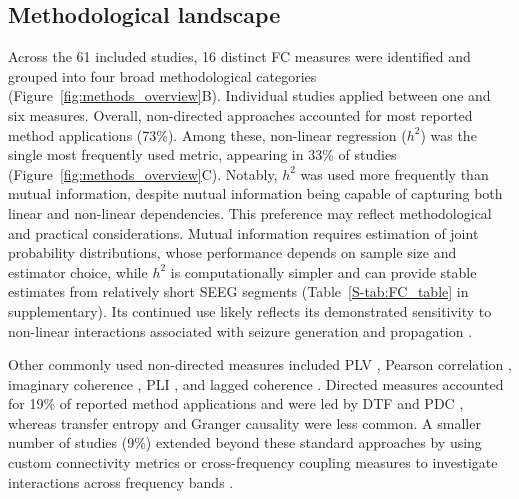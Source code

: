 \documentclass[12pt]{article}
\begin{document}
\subsection{Methodological landscape}
Across the 61 included studies, 16 distinct FC measures were identified and grouped into four broad methodological categories (Figure~\ref{fig:methods_overview}B). Individual studies applied between one and six measures. Overall, non-directed approaches accounted for most reported method applications (73\%). Among these, non-linear regression ($h^2$) was the single most frequently used metric, appearing in 33\% of studies \cite{Bettus2011-jh, Evangelista2015-dz, Courtens2016-zs, Hagiwara2017-sz, lagarde2018interictal, Aupy2019-je, Wang2019-jl, Balatskaya2020-vi, Fonti2021-dz, Wang2021-iw, Hu2023-kr, Li2023-vy, Simula2023-lj, Soulier2023-rr, Yang2023-xe, Ye2023-jm, Soncin2024-iz, Zanello2024-ap, Chibany2025-ob, He2025-tw} (Figure~\ref{fig:methods_overview}C). Notably, $h^2$ was used more frequently than mutual information, despite mutual information being capable of capturing both linear and non-linear dependencies. This preference may reflect methodological and practical considerations. Mutual information requires estimation of joint probability distributions, whose performance depends on sample size and estimator choice, while $h^2$ is computationally simpler and can provide stable estimates from relatively short SEEG segments (Table~\ref{S-tab:FC_table} in supplementary). Its continued use likely reflects its demonstrated sensitivity to non-linear interactions associated with seizure generation and propagation \cite{pijn1990localization}.

Other commonly used non-directed measures included PLV \cite{Frusque2020-bn, Cousyn2023-fj, Wang2021-iw, Conrad2024-uh, Ivankovic2025-ng, Li2025-os}, Pearson correlation \cite{Antony2013-jw, Tauste_Campo2018-ga, Mo2021-ig, Lopes2021-sf, Wang2023-ys, Vila-Vidal2024-ha, Conrad2024-uh}, imaginary coherence \cite{Goodale2020-lj, Jung2022-rx, Paulo2022-pt, Xu2023-rm, Doss2024-rs}, PLI \cite{Van_Diessen2013-pr, Wang2023-ys, Ivankovic2025-ng, Xu2025-lh}, and lagged coherence \cite{Shahabi2023-ak}. Directed measures accounted for 19\% of reported method applications and were led by DTF \cite{Narasimhan2020-af, Jiang2022-uq, Krishnan2024-sq, Peng2025-nx, Wang2025-ij, Xu2025-lh, Yang2018-yx} and PDC \cite{Li2016-hi, Paulo2022-pt, Doss2024-ce, Yin2024-ls}, whereas transfer entropy \cite{Sun2024-bj, Hou2025-es} and Granger causality \cite{Nahvi2023-lm} were less common. A smaller number of studies (9\%) extended beyond these standard approaches by using custom connectivity metrics \cite{Gunnarsdottir2022-la, Jiang2022-uq} or cross-frequency coupling measures to investigate interactions across frequency bands \cite{Li2021-gq}.
\end{document}
